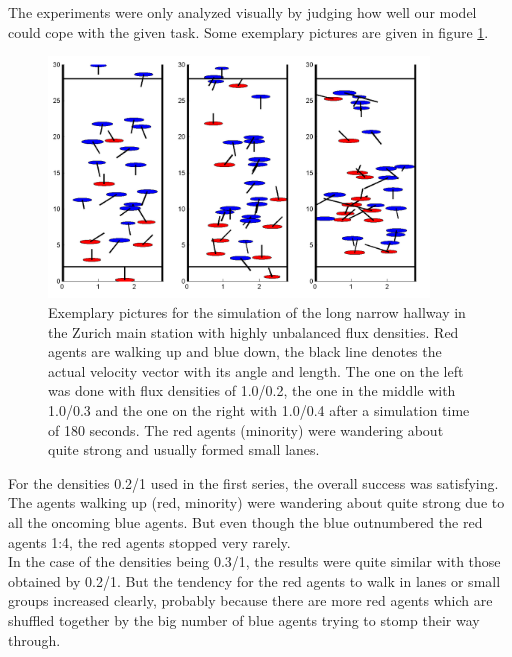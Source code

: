 
\noi The experiments were only analyzed visually by judging how well our model could cope with the given task. Some exemplary pictures are given in figure \ref{fig:ex6picture}.\\
\begin{figure}[h!]
	\centering
		\includegraphics[width=0.90\textwidth]{pictures/ex6picture.png}
	\caption{Exemplary pictures for the simulation of the long narrow hallway in the Zurich main station with highly unbalanced flux densities. Red agents are walking up and blue down, the black line denotes the actual velocity vector with its angle and length. The one on the left was done with flux densities of 1.0/0.2, the one in the middle with 1.0/0.3 and the one on the right with 1.0/0.4 after a simulation time of 180 seconds. The red agents (minority) were wandering about quite strong and usually formed small lanes.}
	\label{fig:ex6picture}
\end{figure}

\noi For the densities 0.2/1 used in the first series, the overall success was satisfying. The agents walking up (red, minority) were wandering about quite strong due to all the oncoming blue agents. But even though the blue outnumbered the red agents 1:4, the red agents stopped very rarely.\\

\noi In the case of the densities being 0.3/1, the results were quite similar with those obtained by 0.2/1. But the tendency for the red agents to walk in lanes or small groups increased clearly, probably because there are more red agents which are shuffled together by the big number of blue agents trying to stomp their way through.\\

